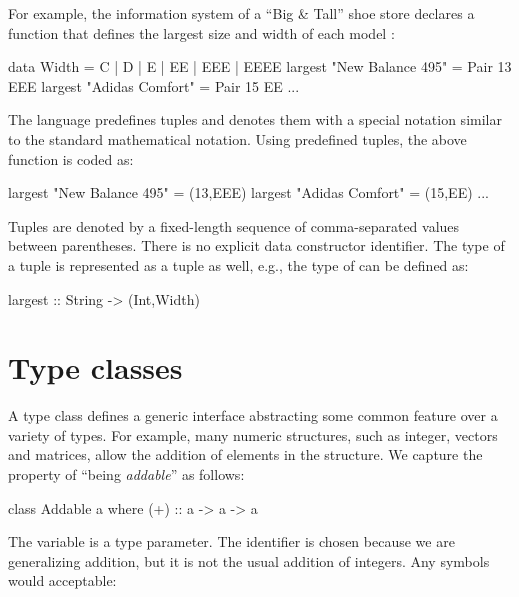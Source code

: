 For example, the information system of a ``Big \& Tall'' shoe store
declares a function that defines the largest size and width of each model
:
%
\begin{curry}
data Width = C | D | E | EE | EEE | EEEE
largest "New Balance 495" = Pair 13 EEE
largest "Adidas Comfort"  = Pair 15 EE
...
\end{curry}
%
The language predefines tuples and denotes them with a special
notation similar to the standard mathematical notation.
Using predefined tuples, the above function is coded as:
%
\begin{curry}
largest "New Balance 495" = (13,EEE)
largest "Adidas Comfort"  = (15,EE)
...
\end{curry}
%
Tuples are denoted by a fixed-length sequence of comma-separated
values between parentheses.
There is no explicit data constructor identifier.
The type of a tuple is represented
as a tuple as well, e.g., the type of 
can be defined as:
%
\begin{curry}
largest :: String -> (Int,Width)
\end{curry}
%

\section{Type classes}
\label{Type classes}


A type class defines a generic interface abstracting
some common feature over a variety of types.
For example, many numeric structures, such as integer,
vectors and matrices, allow the addition of elements in the structure.
We capture the property of ``being \emph{addable}'' as follows:
%
\begin{curry}
class Addable a where
  (+) :: a ->  a  -> a
\end{curry}
%
The variable  is a type parameter.
The identifier \ccode{+} is chosen because we are generalizing
addition, but it is not the usual addition of integers.
Any symbols would acceptable:


